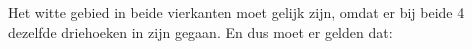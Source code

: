 \documentclass[preview]{standalone}
\begin{document}
\begin{center}
Het witte gebied in beide vierkanten moet gelijk zijn, omdat er bij beide 4 dezelfde driehoeken in zijn gegaan. En dus moet er gelden dat:
\end{center}
\end{document}
